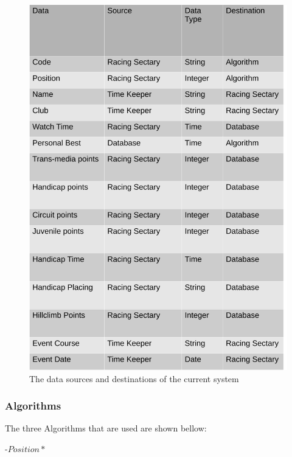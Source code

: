 \begin{figure}[H]
    \includegraphics[width=\textwidth]{./DataSources.pdf}
    \caption{The data sources and destinations of the current system} \label{fig:Data_Sources}
\end{figure}



\subsubsection{Algorithms}
The three Algorithms that are used are shown bellow:

\begin{algorithm}[H]
\label{fig:Ride Time Algorithm}
	\caption{$Ride Time Algorithum$}
\begin{algorithmic}[1]
-{$Position*$}
\end{algorithmic}
\end{algorithm}

